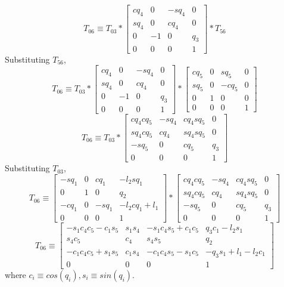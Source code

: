 \documentclass[12pt]{article}
\begin{document}
\[
  T_{06} \equiv
  T_{03}
  * \begin{bmatrix} cq_4 & 0 & -sq_4 & 0 \\ sq_4 & 0 & cq_4 & 0 \\ 0 & -1 & 0 & q_3 \\ 0 & 0 & 0 & 1 \end{bmatrix}
  * T_{56}
\]
Substituting $T_{56}$,
\[
  T_{06} \equiv
  T_{03}
  * \begin{bmatrix} cq_4 & 0 & -sq_4 & 0 \\ sq_4 & 0 & cq_4 & 0 \\ 0 & -1 & 0 & q_3 \\ 0 & 0 & 0 & 1 \end{bmatrix}
  * \begin{bmatrix} cq_5 & 0 & sq_5 & 0 \\ sq_5 & 0 & -cq_5 & 0 \\ 0 & 1 & 0 & 0 \\ 0 & 0 & 0 & 1 \end{bmatrix}
\]
\[
  T_{06} \equiv
  T_{03}
  * \begin{bmatrix} cq_4cq_5 & -sq_4 & cq_4sq_5 & 0 \\ sq_4cq_5 & cq_4 & sq_4sq_5 & 0 \\ -sq_5 & 0 & cq_5 & q_3 \\ 0 & 0 & 0 & 1 \end{bmatrix}
\]
Substituting $T_{03}$,
\[
  T_{06} \equiv
  \begin{bmatrix} -sq_1 & 0 & cq_1 & -l_2sq_1 \\ 0 & 1 & 0 & q_2 \\ -cq_1 & 0 & -sq_1 & -l_2cq_1 + l_1 \\ 0 & 0 & 0 & 1 \end{bmatrix}
  * \begin{bmatrix} cq_4cq_5 & -sq_4 & cq_4sq_5 & 0 \\ sq_4cq_5 & cq_4 & sq_4sq_5 & 0 \\ -sq_5 & 0 & cq_5 & q_3 \\ 0 & 0 & 0 & 1 \end{bmatrix}
\]
\[
  T_{06} \equiv
  \begin{bmatrix} -s_1c_4c_5 - c_1s_5 & s_1s_4 & -s_1c_4s_5 + c_1c_5 & q_3c_1 - l_2s_1 \\ s_4c_5 & c_4 & s_4s_5 & q_2 \\ -c_1c_4c_5 + s_1s_5 & c_1s_4 & -c_1c_4s_5 - s_1c_5 & -q_3s_1 + l_1 - l_2c_1 \\ 0 & 0 & 0 & 1 \end{bmatrix}
\]
where $c_i \equiv cos(q_i), s_i \equiv sin(q_i)$.
\end{document}

